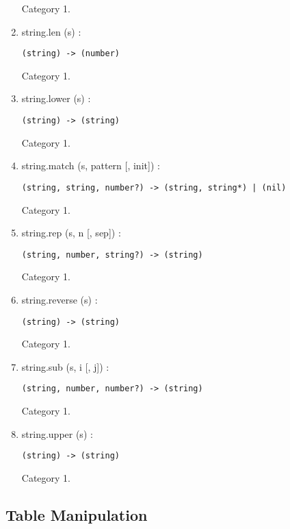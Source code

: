 \documentclass{paper}
\begin{document}
\begin{enumerate}
Category 1.
\item string.len (s) :
\begin{verbatim}
(string) -> (number)
\end{verbatim}
Category 1.
\item string.lower (s) :
\begin{verbatim}
(string) -> (string)
\end{verbatim}
Category 1.
\item string.match (s, pattern [, init]) :
\begin{verbatim}
(string, string, number?) -> (string, string*) | (nil)
\end{verbatim}
Category 1.
\item string.rep (s, n [, sep]) :
\begin{verbatim}
(string, number, string?) -> (string)
\end{verbatim}
Category 1.
\item string.reverse (s) :
\begin{verbatim}
(string) -> (string)
\end{verbatim}
Category 1.
\item string.sub (s, i [, j]) :
\begin{verbatim}
(string, number, number?) -> (string)
\end{verbatim}
Category 1.
\item string.upper (s) :
\begin{verbatim}
(string) -> (string)
\end{verbatim}
Category 1.
\end{enumerate}

\subsection{Table Manipulation}
\end{document}
